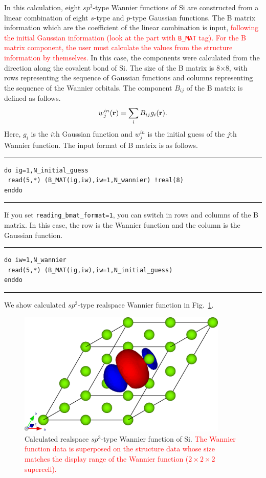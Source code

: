 \documentclass{article}
\newcommand{\tr}[1]{\textcolor{red}{#1}}
\begin{document}
In this calculation, eight $sp^3$-type Wannier functions of Si are constructed from a linear combination of eight $s$-type and $p$-type Gaussian functions. The B matrix information which are the coefficient of the linear combination is input, \tr{following the initial Gaussian information (look at the part with {\tt B\_MAT} tag). For the B matrix component, the user must calculate the values from the structure information by themselves.} In this case, the components were calculated from the direction along the covalent bond of Si. The size of the B matrix is 8$\times$8, with rows representing the sequence of Gaussian functions and columns representing the sequence of the Wannier orbitals. The component $B_{ij}$ of the B matrix is defined as follows.
\begin{eqnarray}
w_{j}^{in}({\bf r})=\sum_{i}B_{ij} g_i({\bf r}). \nonumber 
\end{eqnarray} 
Here, $g_i$ is the $i$th Gaussian function and $w_{j}^{in}$ is the initial guess of the $j$th Wannier function. The input format of B matrix is as follows. 
\vspace{3mm}\hrule
\begin{verbatim}
do ig=1,N_initial_guess 
 read(5,*) (B_MAT(ig,iw),iw=1,N_wannier) !real(8)
enddo
\end{verbatim}
\hrule\vspace{3mm}
If you set \verb+reading_bmat_format=1+, you can switch in rows and columns of the B matrix. In this case, the row is the Wannier function and the column is the Gaussian function.
\vspace{3mm}\hrule
\begin{verbatim}
do iw=1,N_wannier
 read(5,*) (B_MAT(ig,iw),iw=1,N_initial_guess)
enddo
\end{verbatim}
\hrule\vspace{3mm}
We show calculated $sp^3$-type realspace Wannier function in Fig.~\ref{vesta-Si}.
\begin{figure}[H] 
\centering
\includegraphics[width=10cm]{dat.wan-realspace-Si.eps}
\caption{Calculated realspace $sp^3$-type Wannier function of Si. \tr{The Wannier function data is superposed on the structure data whose size matches the display range of the Wannier function ($2\times2\times2$ supercell).}}
\label{vesta-Si}
\end{figure}
\end{document}
